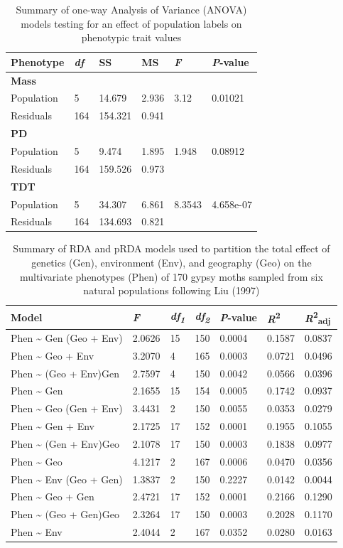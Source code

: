 \begin{longtable}[c]{@{}llllll@{}}
\caption{Summary of one-way Analysis of Variance (ANOVA)
models testing for an effect of population labels on phenotypic trait
values}\\
\toprule
Phenotype & \emph{df} & SS & MS & \emph{F} &
\emph{P}-value\tabularnewline
\midrule
\endhead
\textbf{Mass} & & & & &\tabularnewline
Population & 5 & 14.679 & 2.936 & 3.12 & 0.01021\tabularnewline
Residuals & 164 & 154.321 & 0.941 & &\tabularnewline
\textbf{PD} & & & & &\tabularnewline
Population & 5 & 9.474 & 1.895 & 1.948 & 0.08912\tabularnewline
Residuals & 164 & 159.526 & 0.973 & &\tabularnewline
\textbf{TDT} & & & & &\tabularnewline
Population & 5 & 34.307 & 6.861 & 8.3543 & 4.658e-07\tabularnewline
Residuals & 164 & 134.693 & 0.821 & &\tabularnewline
\bottomrule
\end{longtable}

\begin{longtable}[c]{@{}lllllll@{}}
\caption{Summary of RDA and pRDA models used to partition the
total effect of genetics (Gen), environment (Env), and geography (Geo)
on the multivariate phenotypes (Phen) of 170 gypsy moths sampled from
six natural populations following Liu (1997)}\\
\toprule
Model & \emph{F} & \emph{df\textsubscript{1}} &
\emph{df\textsubscript{2}} & \emph{P}-value &
\emph{R}\textsuperscript{2} &
\emph{R}\textsuperscript{2}\textsubscript{adj}\tabularnewline%
\midrule
\endhead%
Phen \textasciitilde{} Gen\textbar{} (Geo + Env) & 2.0626 & 15 & 150 &
0.0004 & 0.1587 & 0.0837\tabularnewline%
Phen \textasciitilde{} Geo + Env & 3.2070 & 4 & 165 & 0.0003 & 0.0721 &
0.0496\tabularnewline%
Phen \textasciitilde{} (Geo + Env)\textbar{}Gen & 2.7597 & 4 & 150 &
0.0042 & 0.0566 & 0.0396\tabularnewline%
Phen \textasciitilde{} Gen & 2.1655 & 15 & 154 & 0.0005 & 0.1742 &
0.0937\tabularnewline%
Phen \textasciitilde{} Geo\textbar{} (Gen + Env) & 3.4431 & 2 & 150 &
0.0055 & 0.0353 & 0.0279\tabularnewline%
Phen \textasciitilde{} Gen + Env & 2.1725 & 17 & 152 & 0.0001 & 0.1955 &
0.1055\tabularnewline%
Phen \textasciitilde{} (Gen + Env)\textbar{}Geo & 2.1078 & 17 & 150 &
0.0003 & 0.1838 & 0.0977\tabularnewline%
Phen \textasciitilde{} Geo & 4.1217 & 2 & 167 & 0.0006 & 0.0470 &
0.0356\tabularnewline%
Phen \textasciitilde{} Env\textbar{} (Geo + Gen) & 1.3837 & 2 & 150 &
0.2227 & 0.0142 & 0.0044\tabularnewline%
Phen \textasciitilde{} Geo + Gen & 2.4721 & 17 & 152 & 0.0001 & 0.2166 &
0.1290\tabularnewline%
Phen \textasciitilde{} (Geo + Gen)\textbar{}Geo & 2.3264 & 17 & 150 &
0.0003 & 0.2028 & 0.1170\tabularnewline%
Phen \textasciitilde{} Env & 2.4044 & 2 & 167 & 0.0352 & 0.0280 &
0.0163\tabularnewline%
\bottomrule
\end{longtable}


